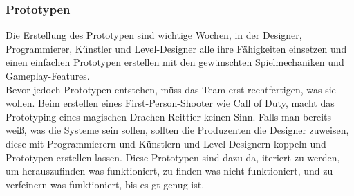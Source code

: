 \subsubsection*{Prototypen}
Die Erstellung des Prototypen sind wichtige Wochen, in der Designer, Programmierer, Künstler und Level-Designer alle ihre Fähigkeiten einsetzen und einen einfachen Prototypen erstellen mit den gewünschten Spielmechaniken und Gameplay-Features.
\\
Bevor jedoch Prototypen entstehen, müss das Team erst rechtfertigen, was sie wollen. Beim erstellen eines First-Person-Shooter wie Call of Duty, macht das Prototyping eines magischen Drachen Reittier keinen Sinn. Falls man bereits weiß, was die Systeme sein sollen, sollten die Produzenten die Designer zuweisen, diese mit Programmierern und Künstlern und Level-Designern koppeln und Prototypen erstellen lassen. Diese Prototypen sind dazu da, iteriert zu werden, um herauszufinden was funktioniert, zu finden was nicht funktioniert, und zu verfeinern was funktioniert, bis es gt genug ist.